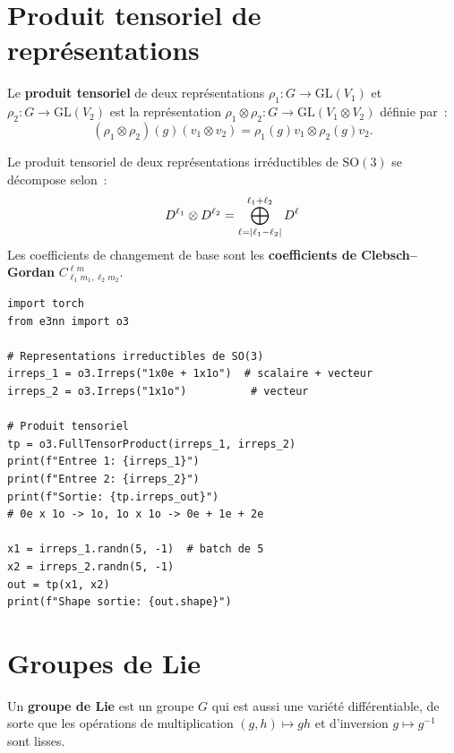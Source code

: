 \section{Produit tensoriel de repr\'esentations}

\begin{definition}
Le \textbf{produit tensoriel} de deux repr\'esentations $\rho_1: G \to \mathrm{GL}(V_1)$
et $\rho_2: G \to \mathrm{GL}(V_2)$ est la repr\'esentation
$\rho_1 \otimes \rho_2: G \to \mathrm{GL}(V_1 \otimes V_2)$ d\'efinie par~:
\[
    (\rho_1 \otimes \rho_2)(g)(v_1 \otimes v_2) = \rho_1(g)v_1 \otimes \rho_2(g)v_2.
\]
\end{definition}

\begin{theoreme}
Le produit tensoriel de deux repr\'esentations irr\'eductibles de $\mathrm{SO}(3)$
se d\'ecompose selon~:
\[
    D^{\ell_1} \otimes D^{\ell_2} = \bigoplus_{\ell=\left| \ell_1-\ell_2 \right|}^{\ell_1+\ell_2} D^{\ell}
\]
Les coefficients de changement de base sont les \textbf{coefficients de
Clebsch--Gordan} $C^{\ell m}_{\ell_1 m_1, \ell_2 m_2}$.
\end{theoreme}

\begin{codeblock}[title=\textbf{Produit tensoriel avec e3nn}]
\begin{verbatim}
import torch
from e3nn import o3

# Representations irreductibles de SO(3)
irreps_1 = o3.Irreps("1x0e + 1x1o")  # scalaire + vecteur
irreps_2 = o3.Irreps("1x1o")          # vecteur

# Produit tensoriel
tp = o3.FullTensorProduct(irreps_1, irreps_2)
print(f"Entree 1: {irreps_1}")
print(f"Entree 2: {irreps_2}")
print(f"Sortie: {tp.irreps_out}")
# 0e x 1o -> 1o, 1o x 1o -> 0e + 1e + 2e

x1 = irreps_1.randn(5, -1)  # batch de 5
x2 = irreps_2.randn(5, -1)
out = tp(x1, x2)
print(f"Shape sortie: {out.shape}")
\end{verbatim}
\end{codeblock}

\section{Groupes de Lie}

\begin{definition}
Un \textbf{groupe de Lie} est un groupe $G$ qui est aussi une vari\'et\'e
diff\'erentiable, de sorte que les op\'erations de multiplication
$(g, h) \mapsto gh$ et d'inversion $g \mapsto g^{-1}$ sont lisses.
\end{definition}

